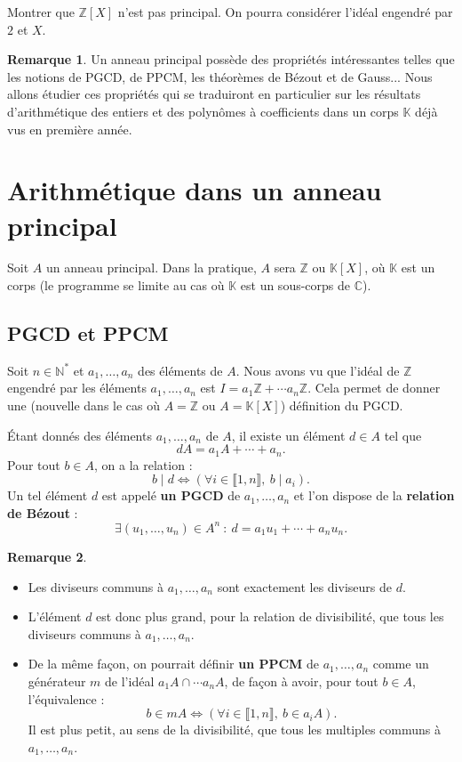 \documentclass[french]{article}
\newcommand{\N}{\mathbb{N}}
\newcommand{\Z}{\mathbb{Z}}
\newcommand{\C}{\mathbb{C}}
\newcommand{\K}{\mathbb{K}}
\newcommand{\st}{^*}
\theoremstyle{plain}
\theoremstyle{definition}
\newtheorem*{rmq}{Remarque}
\theoremstyle{remark}
\begin{document}
\begin{exo}
	Montrer que $\Z[X]$ n'est pas principal. On pourra considérer l'idéal engendré par $2$ et $X$.
\end{exo}

\begin{rmq}
	Un anneau principal possède des propriétés intéressantes telles que les notions de PGCD, de PPCM, les théorèmes de Bézout et de Gauss... Nous allons étudier ces propriétés qui se traduiront en particulier sur les résultats d'arithmétique des entiers et des polynômes à coefficients dans un corps $\K$ déjà vus en première année.
\end{rmq}

\section{Arithmétique dans un anneau principal}

Soit $A$ un anneau principal. Dans la pratique, $A$ sera $\Z$ ou $\K[X]$, où $\K$ est un corps (le programme se limite au cas où $\K$ est un sous-corps de $\C$).

\subsection{PGCD et PPCM}

Soit $n\in\N\st$ et $a_1,\ldots,a_n$ des éléments de $A$. Nous avons vu que l'idéal de $\Z$ engendré par les éléments $a_1,\ldots,a_n$ est $I=a_1\Z+\cdots a_n\Z$. Cela permet de donner une (nouvelle dans le cas où $A=\Z$ ou $A=\K[X]$) définition du PGCD.

\begin{prop}%
	Étant donnés des éléments $a_1,\ldots,a_n$ de $A$, il existe un élément $d\in A$ tel que $$dA=a_1A+\cdots+a_n.$$ Pour tout $b\in A$, on a la relation :
	$$b\mid d\iff (\forall i\in\llbracket1,n\rrbracket,\ b\mid a_i).$$
	Un tel élément $d$ est appelé \textbf{un PGCD} de $a_1,\ldots,a_n$ et l'on dispose de la \textbf{relation de Bézout} :
	$$\exists (u_1,\ldots,u_n)\in A^n\ :\ d=a_1u_1+\cdots+a_nu_n.$$
\end{prop}

\begin{rmq}
	\begin{itemize}
		\item Les diviseurs communs à $a_1,\ldots,a_n$ sont exactement les diviseurs de $d$.
		\item L'élément $d$ est donc plus grand, pour la relation de divisibilité, que tous les diviseurs communs à $a_1,\ldots,a_n$.
		\item De la même façon, on pourrait définir \textbf{un PPCM} de $a_1,\ldots,a_n$ comme un générateur $m$ de l'idéal $a_1A\cap\cdots a_nA$, de façon à avoir, pour tout $b\in A$, l'équivalence :
		$$b\in mA\iff (\forall i\in\llbracket1,n\rrbracket,\ b\in a_iA).$$
		Il est plus petit, au sens de la divisibilité, que tous les multiples communs à $a_1,\ldots,a_n$.
	\end{itemize}
\end{rmq}
\end{document}
